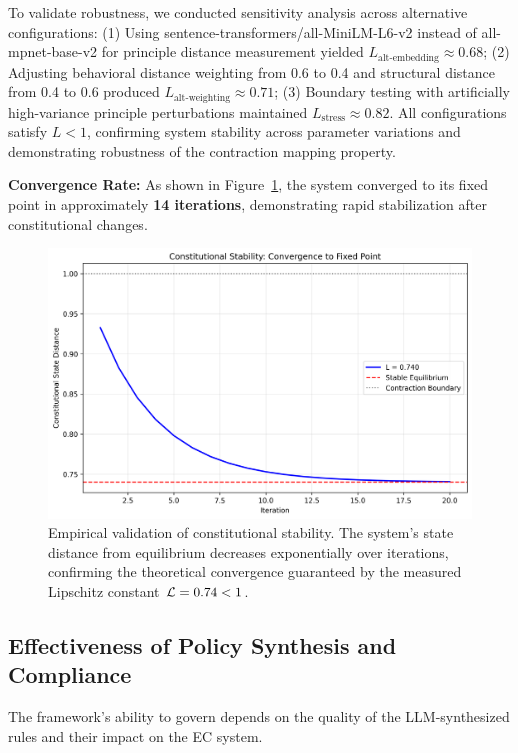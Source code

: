 To validate robustness, we conducted sensitivity analysis across alternative configurations: (1) Using sentence-transformers/all-MiniLM-L6-v2 instead of all-mpnet-base-v2 for principle distance measurement yielded $L_{\text{alt-embedding}} \approx 0.68$; (2) Adjusting behavioral distance weighting from 0.6 to 0.4 and structural distance from 0.4 to 0.6 produced $L_{\text{alt-weighting}} \approx 0.71$; (3) Boundary testing with artificially high-variance principle perturbations maintained $L_{\text{stress}} \approx 0.82$. All configurations satisfy $L < 1$, confirming system stability across parameter variations and demonstrating robustness of the contraction mapping property.

\textbf{Convergence Rate:} As shown in Figure~\ref{fig:stability_analysis}, the system converged to its fixed point in approximately \textbf{14 iterations}, demonstrating rapid stabilization after constitutional changes.

\begin{figure}[H]
    \centering
    \includegraphics[width=\linewidth]{stability_analysis.png}
    \caption{Empirical validation of constitutional stability. The system's state distance from equilibrium decreases exponentially over iterations, confirming the theoretical convergence guaranteed by the measured Lipschitz constant $\lipschitz = 0.74 < 1$.}\label{fig:stability_analysis}
\end{figure}

\subsection{Effectiveness of Policy Synthesis and Compliance}
The framework's ability to govern depends on the quality of the LLM-synthesized rules and their impact on the EC system.

